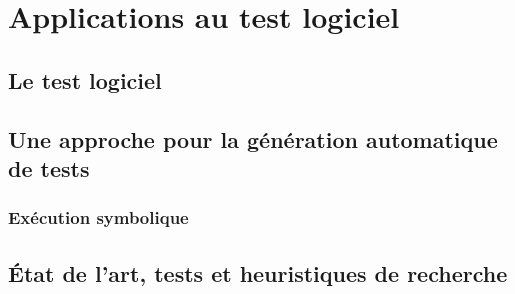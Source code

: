 \chapter{Applications au test logiciel}

\label{Chapter2} %

\section{Le test logiciel}

\section{Une approche pour la génération automatique de tests}

\subsection{Exécution symbolique}

\section{État de l'art, tests et heuristiques de recherche}


